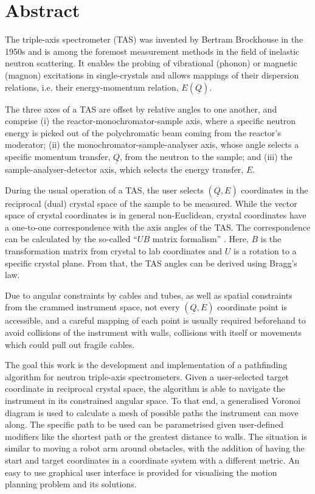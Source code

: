 %
%

\chapter*{Abstract}

The triple-axis spectrometer (TAS) \cite{Shirane2002} was invented by Bertram Brockhouse in the 1950s and
is among the foremost measurement methods in the field of inelastic neutron scattering. 
It enables the probing of vibrational (phonon) or magnetic (magnon) excitations in single-crystals and allows 
mappings of their dispersion relations, i.e. their energy-momentum relation, $E\left( \underline{Q} \right)$.

The three axes of a TAS are offset by relative angles to one another, and comprise 
(i) the reactor-monochromator-sample axis, where a specific neutron energy is picked out of the polychromatic 
beam coming from the reactor's moderator; 
(ii) the monochromator-sample-analyser axis, whose angle selects a specific momentum transfer, $\underline{Q}$, 
from the neutron to the sample; and 
(iii) the sample-analyser-detector axis, which selects the energy transfer, $E$.

During the usual operation of a TAS, the user selects $\left( \underline{Q}, E \right)$ coordinates
in the reciprocal (dual) crystal space of the sample to be measured. While the vector space of crystal coordinates
is in general non-Euclidean, crystal coordinates have a one-to-one correspondence with the axis angles 
of the TAS. The correspondence can be calculated by the so-called ``$UB$ matrix formalism'' \cite{Lumsden2005}. 
Here, $B$ is the transformation matrix from crystal to lab coordinates and $U$ is a rotation to a specific 
crystal plane. From that, the TAS angles can be derived using Bragg's law.

Due to angular constraints by cables and tubes, as well as spatial constraints from the crammed instrument space, 
not every $\left( \underline{Q}, E \right)$ coordinate point is accessible, and a careful mapping of each point is
usually required beforehand to avoid collisions of the instrument with walls, collisions with itself or movements
which could pull out fragile cables.

The goal this work is the development and implementation of a pathfinding algorithm for
neutron triple-axis spectrometers.
Given a user-selected target coordinate in reciprocal crystal space,
the algorithm is able to navigate the instrument in its constrained angular space.
To that end, a generalised Voronoi diagram is used to calculate a mesh of possible paths
the instrument can move along. The specific path to be used can be parametrised given
user-defined modifiers like the shortest path or the greatest distance to walls.
The situation is similar to moving a robot arm around obstacles, with the addition of having
the start and target coordinates in a coordinate system with a different metric.
An easy to use graphical user interface is provided for visualising the motion planning
problem and its solutions.

